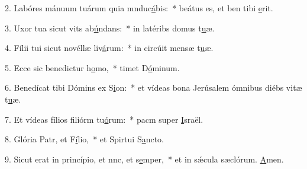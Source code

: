2. Labóres mánuum tuárum quia mnduc\uline{á}bis:~* beátus es, et ben tibi \uline{e}rit.\par 
3. Uxor tua sicut vits ab\uline{ú}ndans:~* in latéribs domus t\uline{u}æ.\par 
4. Fílii tui sicut novéllæ liv\uline{á}rum:~* in circúit mensæ t\uline{u}æ.\par 
5. Ecce sic benedictur h\uline{o}mo,~*  timet D\uline{ó}minum.\par 
6. Benedícat tibi Dómins ex S\uline{i}on:~* et vídeas bona Jerúsalem ómnibus diébs vitæ t\uline{u}æ.\par 
7. Et vídeas fílios filiórm tu\uline{ó}rum:~* pacm super \uline{I}sraël.\par 
8. Glória Patr, et F\uline{í}lio,~* et Spirtui S\uline{a}ncto.\par 
9. Sicut erat in princípio, et nnc, et s\uline{e}mper,~* et in sǽcula sæclórum. \uline{A}men.\par 
